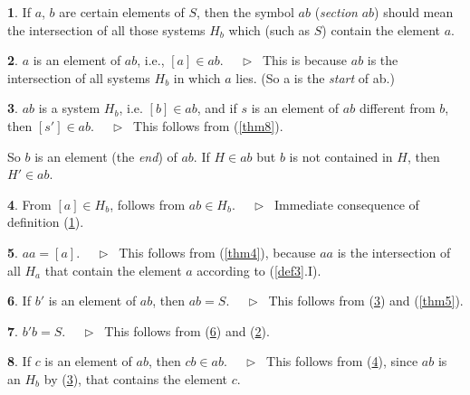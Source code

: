 \documentclass[leqno,hidelinks,a4paper]{article}
\theoremstyle{definition}
\newtheorem{satz}{\protect\satzname}
\newtheorem{deff}[satz]{\protect\deffname}
\newcommand{\satzname}{}
\newcommand{\deffname}{}
\renewcommand{\satzname}{\hspace{-4pt}.\ Satz}%
\renewcommand{\deffname}{\hspace{-4pt}.\ Definition}%
\renewcommand{\satzname}{\hspace{-4pt}.\ Theorem}%
\renewcommand{\deffname}{\hspace{-4pt}.\ Definition}%
\newcommand\Beweis{\medskip \newline $ \phantom{'.'} \rhd \ $}%
\newcommand{\partof}{\in}
\begin{document}
\begin{paracol}{2}
\begin{deff}\label{def9}
If $a$, $b$ are certain elements of $S$, then the symbol $ab$ (\emph{section} $ab$)
should mean the intersection of all those systems $H_b$ which (such as $S$)
contain the element $a$.%
\end{deff}

\newpage

\begin{satz}\label{thm10}
$a$ is an element of $ab$, i.e., $[a] \partof ab$.
\Beweis
This is because $ab$ is the intersection of all systems $H_b$ in which $a$ lies.
(So a is the \emph{start} of ab.)
\end{satz}

\begin{satz}\label{thm11}
$ab$ is a system $H_b$, i.e. $[b] \partof ab$, and if $s$ is an element of $ab$
different from $b$, then $[s'] \partof ab$.
\Beweis
This follows from (\ref{thm8}).
\end{satz}

So $b$ is an element (the \emph{end}) of $ab$. If $H \partof ab$ but $b$ is not
contained in $H$, then $H' \partof ab$.

\begin{satz}\label{thm12}
From $[a] \partof H_b$, follows from $ab \partof H_b$.
\Beweis
Immediate consequence of definition (\ref{def9}).
\end{satz}

\begin{satz}\label{thm13}
$aa = [a]$.
\Beweis
This follows from (\ref{thm4}), because $aa$ is the intersection of all $H_a$
that contain the element $a$ according to (\ref{def3}.I).
\end{satz}

\begin{satz}\label{thm14}
If $b'$ is an element of $ab$, then $ab = S$.
\Beweis
This follows from (\ref{thm11}) and (\ref{thm5}).
\end{satz}

\begin{satz}\label{thm15}
$b' b = S$.
\Beweis
This follows from (\ref{thm14}) and (\ref{thm10}).
\end{satz}

\begin{satz}\label{thm16}
If $c$ is an element of $ab$, then $cb \partof ab$.
\Beweis
This follows from (\ref{thm12}), since $ab$ is an $H_b$ by (\ref{thm11}), that
contains the element $c$.
\end{satz}


\end{paracol}
\end{document}
